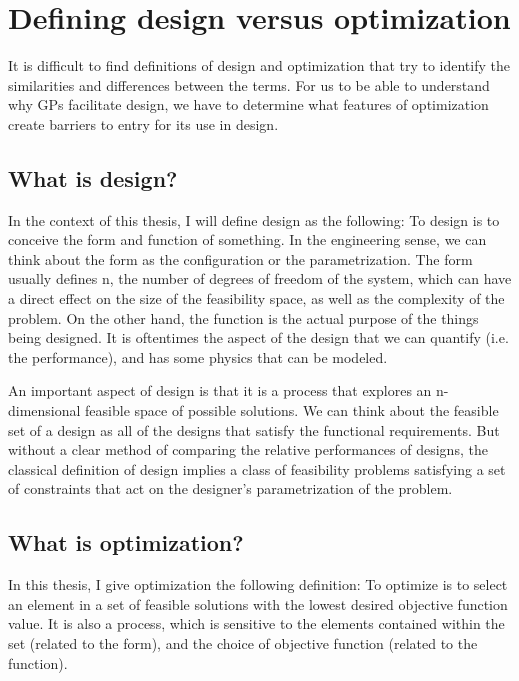 \section{Defining design versus optimization} \label{s:DesVsOpt}

It is difficult to find definitions of design and optimization that
try to identify the similarities and differences between the terms. For us to be
able to understand why \gls{GP}s facilitate design, we have to determine what 
features of optimization create barriers to entry for its use in design. 

\subsection{What is design?}

In the context of this thesis, I will define design as the following:
To design is to conceive the form and function of something.
In the engineering sense, we can think about the form as the configuration or
the parametrization. The form usually defines n, the number of degrees of freedom
of the system, which can have a direct effect on the size of the feasibility
space, as well as the complexity of the problem.
On the other hand, the function is the actual purpose of the things
being designed. It is oftentimes the aspect of the design that we can
quantify (i.e. the performance), and has some physics that can be modeled.

An important aspect of design is that it is a process that explores an
n-dimensional feasible space of possible solutions.
We can think about the feasible set of a design as all of the designs
that satisfy the functional requirements. But without a clear method of comparing
the relative performances of designs, the classical
definition of design implies a class of feasibility problems satisfying a set of
constraints that act on the designer's parametrization of the problem.

\subsection{What is optimization?}

In this thesis, I give optimization the following definition: To optimize is to select an
element in a set of feasible solutions with the lowest desired objective
function value. It is also a process, which is sensitive to the elements contained within the set
(related to the form), and the choice of objective function (related to the 
function).

